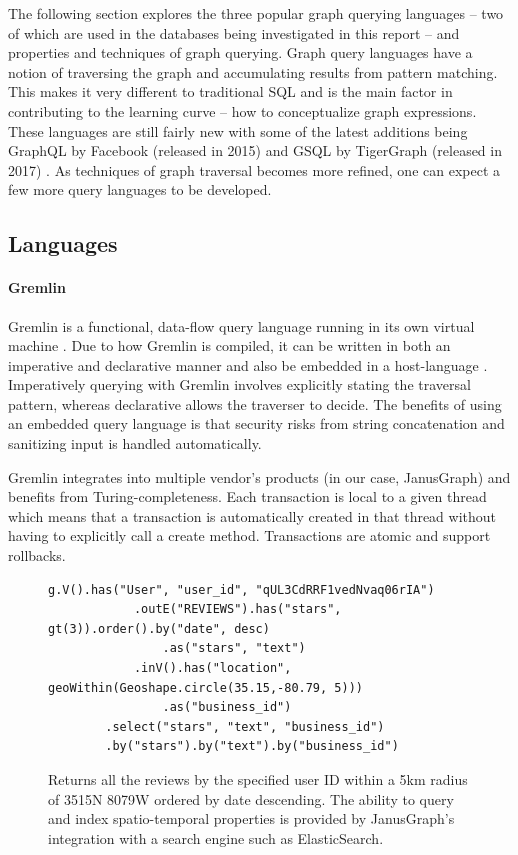 The following section explores the three popular graph querying languages -- two of which are used in the databases being investigated in this report -- and properties and techniques of graph querying. Graph query languages have a notion of traversing the graph and accumulating results from pattern matching. This makes it very different to traditional SQL and is the main factor in contributing to the learning curve -- how to conceptualize graph expressions. These languages are still fairly new with some of the latest additions being GraphQL by Facebook (released in 2015) \cite{graphqlhome} and GSQL by TigerGraph (released in 2017) \cite{tgv1docs}. As techniques of graph traversal becomes more refined, one can expect a few more query languages to be developed.

\subsection{Languages}
\label{subsec:lang}

\paragraph{Gremlin}

Gremlin is a functional, data-flow query language running in its own virtual machine \cite{gremlin-tinkerpop}. Due to how Gremlin is compiled, it can be written in both an imperative and declarative manner and also be embedded in a host-language \cite{tinkerpop-docs}. Imperatively querying with Gremlin involves explicitly stating the traversal pattern, whereas declarative allows the traverser to decide. The benefits of using an embedded query language is that security risks from string concatenation and sanitizing input is handled automatically.

Gremlin integrates into multiple vendor's products (in our case, JanusGraph) and benefits from Turing-completeness. Each transaction is local to a given thread which means that a transaction is automatically created in that thread without having to explicitly call a create method. Transactions are atomic and support rollbacks.

\begin{figure}[h]
    \centering
    \begin{lstlisting}[language=gremlin]
    g.V().has("User", "user_id", "qUL3CdRRF1vedNvaq06rIA")
            .outE("REVIEWS").has("stars", gt(3)).order().by("date", desc)
                .as("stars", "text")
            .inV().has("location", geoWithin(Geoshape.circle(35.15,-80.79, 5)))
                .as("business_id")
        .select("stars", "text", "business_id")
        .by("stars").by("text").by("business_id")
    \end{lstlisting}
    \caption{Returns all the reviews  by the specified user ID within a 5km radius of 35\degree 15N 80\degree 79W ordered by date descending. The ability to query and index spatio-temporal properties is provided by JanusGraph's integration with a search engine such as ElasticSearch.}
    \label{lst:gremlin-example-1}
\end{figure}

